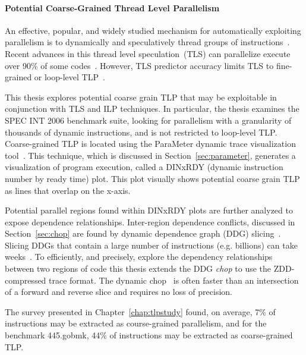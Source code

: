 \documentclass[defaultstyle,11pt]{thesis}
\begin{document}
\noindent\paragraph{Potential Coarse-Grained Thread Level Parallelism}

An effective, popular, and widely studied mechanism for automatically
exploiting parallelism is to dynamically and speculatively thread
groups of
instructions~\cite{steffan:00:isca,prabhu:03:ppopp,wu:2008:cdp,chen:cc:2004,vachharajani:07:pact,dou:2007:trans,wang:2009:dps,marcuello:00:ipdps,bridges:2007:micro,thies:2007:micro,raman:2010:asplos}.
Recent advances in this thread level speculation~(TLS) can parallelize
execute over 90\% of some codes~\cite{marcuello:00:ipdps}.  However,
TLS predictor accuracy limits TLS to fine-grained or loop-level
TLP~\cite{marcuello:00:ipdps,warg:2001:pact,bridges:2007:micro,thies:2007:micro,raman:2010:asplos}.

This thesis explores potential coarse grain TLP that may be
exploitable in conjunction with TLS and ILP techniques.  In
particular, the thesis examines the SPEC INT 2006 benchmark suite,
looking for parallelism with a granularity of thousands of dynamic
instructions, and is not restricted to loop-level TLP.  Coarse-grained
TLP is located using the ParaMeter dynamic trace visualization
tool~\cite{price:08:pact}.  This technique, which is discussed in
Section~\ref{sec:parameter}, generates a visualization of program
execution, called a DINxRDY (dynamic instruction number by ready time)
plot.  This plot visually shows potential coarse grain TLP as lines
that overlap on the x-axis.

Potential parallel regions found within DINxRDY plots are further
analyzed to expose dependence relationships.  Inter-region dependence
conflicts, discussed in Section~\ref{sec:chop} are found by dynamic
dependence graph (DDG)
slicing~\cite{gallager:91:se,agrawal:90:pldi,agrawal:92:thesis,korel:88:ipl}.
Slicing DDGs that contain a large number of instructions
(e.g. billions) can take weeks~\cite{agrawal:90:pldi, zhang:03:icse}.
To efficiently, and precisely, explore the dependency relationships
between two regions of code this thesis extends the DDG \textit{chop}
to use the ZDD-compressed trace format.  The dynamic
chop~\cite{gupta:2005:ase, krinke:2004:sqc} is often faster than an
intersection of a forward and reverse slice and requires no loss of
precision.

The survey presented in Chapter~\ref{chap:tlpstudy} found, on average,
7\% of instructions may be extracted as course-grained parallelism,
and for the benchmark 445.gobmk, 44\% of instructions may be extracted
as coarse-grained TLP.
\end{document}
